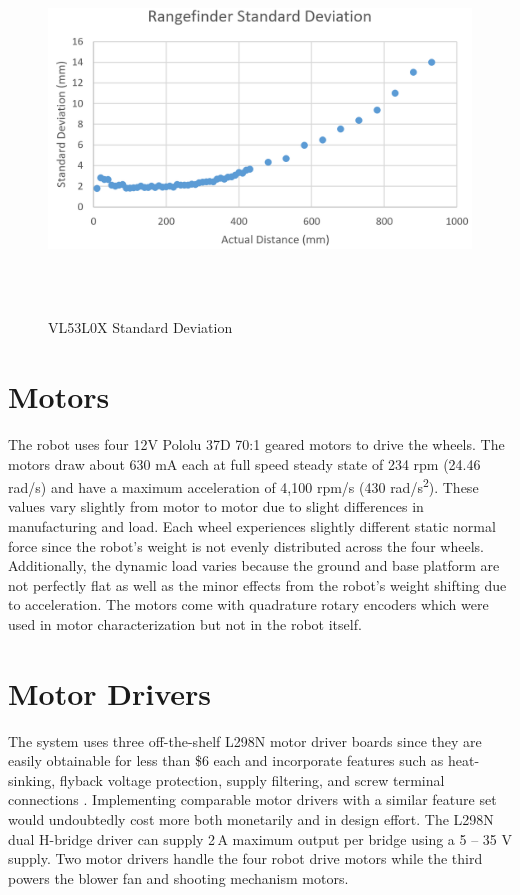 \begin{figure}[H]   %
	\centering \includegraphics[width=6in, height=3.85in, keepaspectratio]{figures/rangefinder_stddev.png}
	\caption{VL53L0X Standard Deviation}\label{fig:rangefinder_stddev}
\end{figure}
\section{Motors}
The robot uses four 12V Pololu 37D 70:1 geared motors to drive the wheels. The motors draw about 630 mA each at full speed steady state of 234 rpm (24.46 rad/s) and have a maximum acceleration of 4,100 rpm/s (430 rad/s\textsuperscript{2}). These values vary slightly from motor to motor due to slight differences in manufacturing and load. Each wheel experiences slightly different static normal force since the robot's weight is not evenly distributed across the four wheels. Additionally, the dynamic load varies because the ground and base platform are not perfectly flat as well as the minor effects from the robot's weight shifting due to acceleration. The motors come with quadrature rotary encoders which were used in motor characterization but not in the robot itself.

\section{Motor Drivers}
The system uses three off-the-shelf L298N motor driver boards since they are easily obtainable for less than \$6 each and incorporate features such as heat-sinking, flyback voltage protection, supply filtering, and screw terminal connections \cite{l298n}. Implementing comparable motor drivers with a similar feature set would undoubtedly cost more both monetarily and in design effort. The L298N dual H-bridge driver can supply 2\,A maximum output per bridge using a 5 -- 35 V supply. Two motor drivers handle the four robot drive motors while the third powers the blower fan and shooting mechanism motors. 

